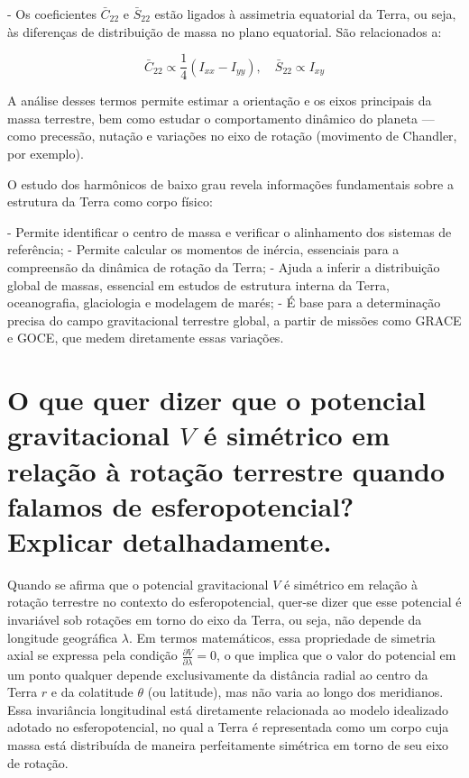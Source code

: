 - Os coeficientes \( \bar{C}_{22} \) e \( \bar{S}_{22} \) estão ligados à assimetria equatorial da Terra, ou seja, às diferenças de distribuição de massa no plano equatorial. São relacionados a:

  \[
  \bar{C}_{22} \propto \frac{1}{4}(I_{xx} - I_{yy}), \quad \bar{S}_{22} \propto I_{xy}
  \]

A análise desses termos permite estimar a orientação e os eixos principais da massa terrestre, bem como estudar o comportamento dinâmico do planeta — como precessão, nutação e variações no eixo de rotação (movimento de Chandler, por exemplo).

O estudo dos harmônicos de baixo grau revela informações fundamentais sobre a estrutura da Terra como corpo físico:

- Permite identificar o centro de massa e verificar o alinhamento dos sistemas de referência;
- Permite calcular os momentos de inércia, essenciais para a compreensão da dinâmica de rotação da Terra;
- Ajuda a inferir a distribuição global de massas, essencial em estudos de estrutura interna da Terra, oceanografia, glaciologia e modelagem de marés;
- É base para a determinação precisa do campo gravitacional terrestre global, a partir de missões como GRACE e GOCE, que medem diretamente essas variações.


\section{O que quer dizer que o potencial gravitacional $V$ é simétrico em relação à rotação terrestre quando falamos de esferopotencial? Explicar detalhadamente.}

Quando se afirma que o potencial gravitacional \( V \) é simétrico em relação à rotação terrestre no contexto do esferopotencial, quer-se dizer que esse potencial é invariável sob rotações em torno do eixo da Terra, ou seja, não depende da longitude geográfica \( \lambda \). Em termos matemáticos, essa propriedade de simetria axial se expressa pela condição \( \frac{\partial V}{\partial \lambda} = 0 \), o que implica que o valor do potencial em um ponto qualquer depende exclusivamente da distância radial ao centro da Terra \( r \) e da colatitude \( \theta \) (ou latitude), mas não varia ao longo dos meridianos. Essa invariância longitudinal está diretamente relacionada ao modelo idealizado adotado no esferopotencial, no qual a Terra é representada como um corpo cuja massa está distribuída de maneira perfeitamente simétrica em torno de seu eixo de rotação.

